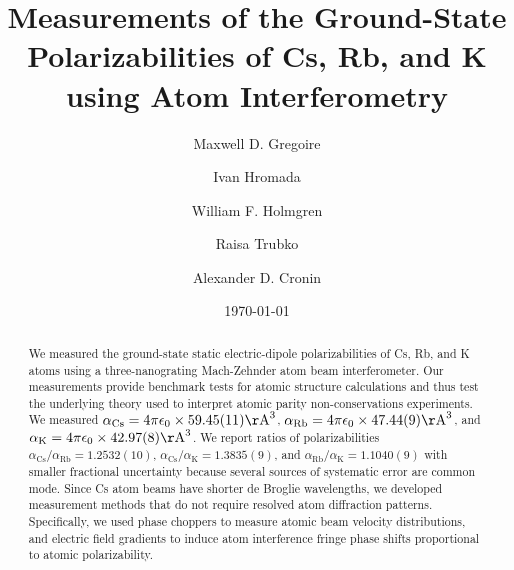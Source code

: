 \documentclass[twocolumn,prl,showpacs,superscriptaddress]{revtex4-1}   %
\newcommand{\ak}{\alpha_{\textrm{K}}}
\newcommand{\arb}{\alpha_{\textrm{Rb}}}
\newcommand{\acs}{\alpha_{\textrm{Cs}}}
\newcommand{\polKSysOnly}{42.97(8)}
\newcommand{\polRbSysOnly}{47.44(9)}
\newcommand{\polCsSysOnly}{59.45(11)}
\newcommand{\ratRbK}{1.1040(9)}
\newcommand{\ratCsK}{1.3835(9)}
\newcommand{\ratCsRb}{1.2532(10)}
\newcommand{\AAA}{\mathrm{\AA}}
\begin{document}
\title{Measurements of the Ground-State Polarizabilities of Cs, Rb, and K using Atom Interferometry}

\author{Maxwell D. Gregoire}
\author{Ivan Hromada}
\author{William F. Holmgren}
\author{Raisa Trubko}
\author{Alexander D. Cronin}

\date{\today}





\begin{abstract}
We measured the ground-state static electric-dipole polarizabilities of Cs, Rb, and K atoms using a three-nanograting Mach-Zehnder atom beam interferometer. Our measurements provide benchmark tests for atomic structure calculations and thus test the underlying theory used to interpret atomic parity non-conservations experiments. We measured $\acs = 4\pi\epsilon_0 \times \polCsSysOnly \AAA^3$, $\arb = 4\pi\epsilon_0 \times \polRbSysOnly \AAA^3$, and $\ak = 4\pi\epsilon_0 \times \polKSysOnly \AAA^3$. We report ratios of polarizabilities $\acs/\arb = \ratCsRb$, $\acs/\ak = \ratCsK$, and $\arb/\ak = \ratRbK$ with smaller fractional uncertainty because several sources of systematic error are common mode. 
Since Cs atom beams have shorter de Broglie wavelengths, we developed measurement methods that do not require resolved atom diffraction patterns.
Specifically, we used phase choppers to measure atomic beam velocity distributions, and electric field gradients to induce atom interference fringe phase shifts proportional to atomic polarizability.
\end{abstract}





\maketitle
\end{document}

